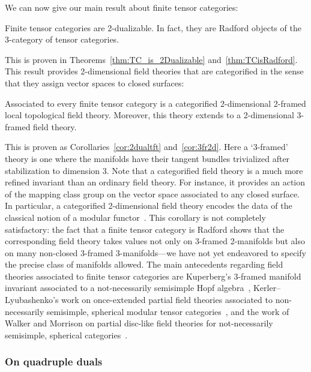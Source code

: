 \documentclass{amsart}
\begin{document}
We can now give our main result about finite tensor categories:
\begin{maintheorem} \label{thm4}
Finite tensor categories are 2-dualizable.  In fact, they are Radford objects of the 3-category of tensor categories.
\end{maintheorem}
\nid This is proven in Theorems~\ref{thm:TC_is_2Dualizable} and~\ref{thm:TCisRadford}.  This result provides 2-dimensional field theories that are categorified in the sense that they assign vector spaces to closed surfaces:
\begin{maincor} \label{cor5}
Associated to every finite tensor category is a categorified 2-dimensional 2-framed local topological field theory.  Moreover, this theory extends to a 2-dimensional 3-framed field theory.
\end{maincor}
\nid This is proven as Corollaries~\ref{cor:2dualtft} and~\ref{cor:3fr2d}.  Here a `3-framed' theory is one where the manifolds have their tangent bundles trivialized after stabilization to dimension 3.  Note that a categorified field theory is a much more refined invariant than an ordinary field theory.  For instance, it provides an action of the mapping class group on the vector space associated to any closed surface.  In particular, a categorified 2-dimensional field theory encodes the data of the classical notion of a modular functor~\cite{Segal, MR1002038, MR1159969,MR1797619}.  This corollary is not completely satisfactory: the fact that a finite tensor category is Radford shows that the corresponding field theory takes values not only on 3-framed 2-manifolds but also on many non-closed 3-framed 3-manifolds---we have not yet endeavored to specify the precise class of manifolds allowed.  The main antecedents regarding field theories associated to finite tensor categories are Kuperberg's 3-framed manifold invariant associated to a not-necessarily semisimple Hopf algebra~\cite{MR1394749}, Kerler--Lyubashenko's work on once-extended partial field theories associated to non-necessarily semisimple, spherical modular tensor categories~\cite{MR1862634}, and the work of Walker and Morrison on partial disc-like field theories for not-necessarily semisimple, spherical categories~\cite{kw:tqft,1009.5025}.



\subsubsection{On quadruple duals}
\end{document}
